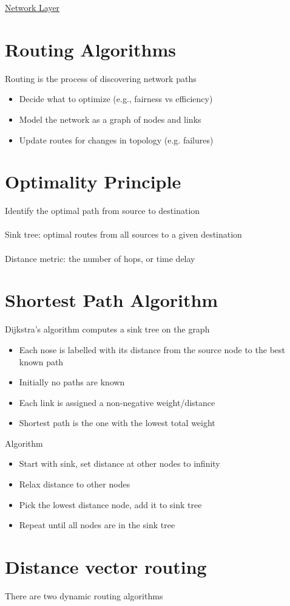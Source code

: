 \documentclass{article}[18pt]
\begin{document}
\begin{center}
\underline{\huge Network Layer}
\end{center}
\section{Routing Algorithms}
Routing is the process of discovering network paths
\begin{itemize}
	\item Decide what to optimize (e.g., fairness vs efficiency)
	\item Model the network as a graph of nodes and links
	\item Update routes for changes in topology (e.g. failures)
\end{itemize}
\section{Optimality Principle}
Identify the optimal path from source to destination\\
\\
Sink tree: optimal routes from all sources to a given destination\\
\\
Distance metric: the number of hops, or time delay
\section{Shortest Path Algorithm}
Dijkstra's algorithm computes a sink tree on the graph
\begin{itemize}
	\item Each nose is labelled with its distance from the source node to the best known path
	\item Initially no paths are known
	\item Each link is assigned a non-negative weight/distance
	\item Shortest path is the one with the lowest total weight
\end{itemize}
Algorithm
\begin{itemize}
	\item Start with sink, set distance at other nodes to infinity
	\item Relax distance to other nodes
	\item Pick the lowest distance node, add it to sink tree
	\item Repeat until all nodes are in the sink tree
\end{itemize}
\section{Distance vector routing}
There are two dynamic routing algorithms
\end{document}
